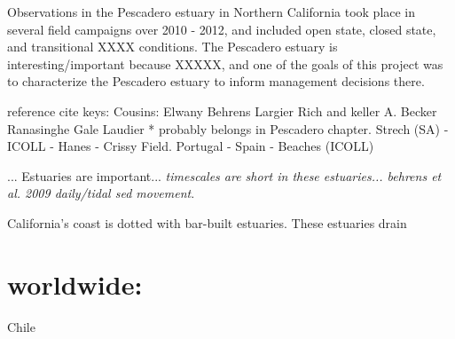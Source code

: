 Observations in the Pescadero estuary in Northern California took place in several field campaigns over 2010 - 2012, and included open state, closed state, and transitional XXXX conditions. The Pescadero estuary is interesting/important because XXXXX, and one of the goals of this project was to characterize the Pescadero estuary to inform management decisions there. 



























reference cite keys:
Cousins: \cite{cousins_effects_2010,cousins_hydrodynamics_2011}
Elwany \cite{elwany_opening_1998}
Behrens \cite{behrens_characterization_2009,behrens_episodic_2013}
Largier \cite{largier_structure_1986,slinger_evolution_1990,largier_circulation_1991,largier_dynamics_1991,largier_stratified_1992,largier_tidal_1992,largier_seasonally_1997}
Rich and keller \cite{rich_hydrologic_2013}
A. Becker \cite{becker_artificial_2009}
Ranasinghe \cite{ranasinghe_flushing_1998,ranasinghe_circulation_1999,ranasinghe_morphodynamic_1999,ranasinghe_seasonal_2003}
Gale \cite{gale_vertical_2006,gale_processes_2007}
Laudier \cite{laudier_measured_2011} * probably belongs in Pescadero chapter.
Strech (SA) - \cite{stretch_breaching_2006,parkinson_breaching_2007}
ICOLL - \cite{haines_morphometric_2006,baldock_morphodynamic_2008,davidson_simple_2009}
Hanes - Crissy Field. \cite{hanes_waves_2011}
Portugal - \cite{fortunato_morphological_2014}
Spain - \cite{moreno_morphodynamics_2010}
\cite{uncles_infragravity_2014}
Beaches (ICOLL)  \cite{weir_beach_2006}

... Estuaries are important... 
\emph{timescales are short in these estuaries... behrens et al. 2009 daily/tidal sed movement}.



California's coast is dotted with bar-built estuaries.  These estuaries drain 


\section{worldwide:}
Chile \parencite{dussaillant_water_2009}


